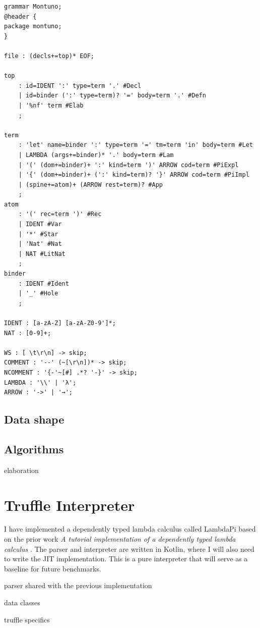 \documentclass[english,zadani,odsaz]{fitthesis}
\begin{document}
\begin{verbatim}
grammar Montuno;
@header {
package montuno;
}

file : (decls+=top)* EOF;

top
    : id=IDENT ':' type=term '.' #Decl
    | id=binder (':' type=term)? '=' body=term '.' #Defn
    | '%nf' term #Elab
    ;

term
    : 'let' name=binder ':' type=term '=' tm=term 'in' body=term #Let
    | LAMBDA (args+=binder)* '.' body=term #Lam
    | '(' (dom+=binder)+ ':' kind=term ')' ARROW cod=term #PiExpl
    | '{' (dom+=binder)+ (':' kind=term)? '}' ARROW cod=term #PiImpl
    | (spine+=atom)+ (ARROW rest=term)? #App
    ;
atom
    : '(' rec=term ')' #Rec
    | IDENT #Var
    | '*' #Star
    | 'Nat' #Nat
    | NAT #LitNat
    ;
binder
    : IDENT #Ident
    | '_' #Hole
    ;

IDENT : [a-zA-Z] [a-zA-Z0-9']*;
NAT : [0-9]+;

WS : [ \t\r\n] -> skip;
COMMENT : '--' (~[\r\n])* -> skip;
NCOMMENT : '{-'~[#] .*? '-}' -> skip;
LAMBDA : '\\' | 'λ';
ARROW : '->' | '→';
\end{verbatim}

\subsection{Data shape}
\label{sec:org1cf8b82}

\subsection{Algorithms}
\label{sec:orgc23ee08}
elaboration

\section{Truffle Interpreter}
\label{sec:orgd235983}
I have implemented a dependently typed lambda calculus called LambdaPi based on
the prior work \emph{A tutorial implementation of a dependently typed lambda calculus}
\cite{loh2010tutorial}. The parser and interpreter are written in Kotlin, where
I will also need to write the JIT implementation. This is a pure interpreter
that will serve as a baseline for future benchmarks.

parser shared with the previous implementation

data classes

truffle specifics
\end{document}
